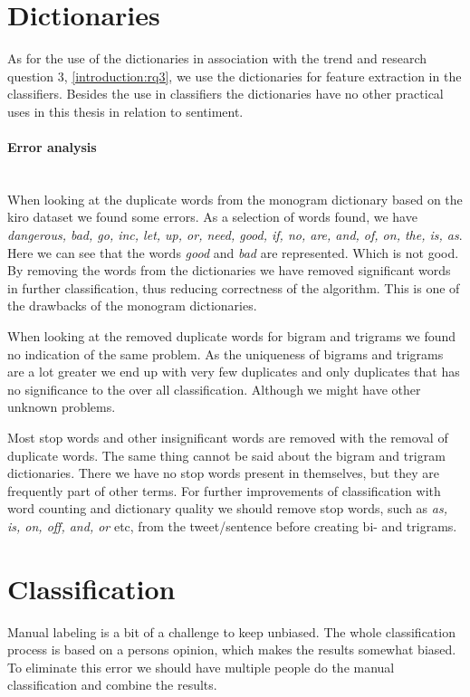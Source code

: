 \section{Dictionaries}\label{results:dictionaries}
As for the use of the dictionaries in association with the trend and research
question 3, \ref{introduction:rq3}, we use the dictionaries for feature
extraction in the classifiers. Besides the use in classifiers the dictionaries
have no other practical uses in this thesis in relation to sentiment.

\paragraph{Error analysis}
\hspace{0pt}\\
When looking at the duplicate words from the monogram dictionary based on the
kiro dataset we found some errors.
As a selection of words found, we have \textit{dangerous, bad, go, inc, let, up,
or, need, good, if, no, are, and, of, on, the,
is, as}.
Here we can see that the words \textit{good} and \textit{bad} are represented.
Which is not good. By removing the words from the dictionaries we have removed
significant words in further classification, thus reducing correctness of the
algorithm. This is one of the drawbacks of the monogram dictionaries.

When looking at the removed duplicate words for bigram and trigrams we found no
indication of the same problem. As the uniqueness of bigrams and trigrams are a
lot greater we end up with very few duplicates and only duplicates that has no
significance to the over all classification. Although we might have other
unknown problems.

Most stop words and other insignificant words are removed with the removal of
duplicate words. The same thing cannot be said about the bigram and trigram
dictionaries. There we have no stop words present in themselves, but they are
frequently part of other terms. For further improvements of classification with
word counting and dictionary quality we should remove
stop words, such as \textit{as, is, on, off, and, or} etc, from the
tweet/sentence before creating bi- and trigrams.
%

\section{Classification}\label{results:classification}
Manual labeling is a bit of a challenge to keep unbiased. The whole
classification process is based on a persons opinion, which makes the results
somewhat biased. To eliminate this error we should have multiple people do the
manual classification and combine the results.  

